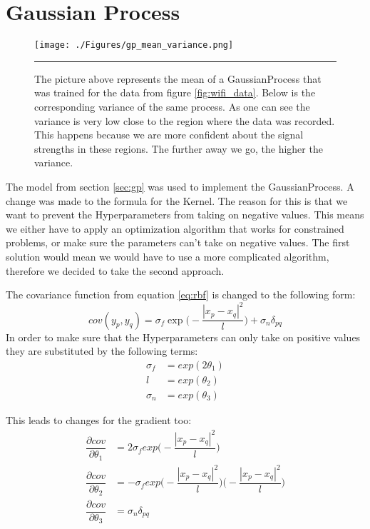 \section{Gaussian Process}\label{sec:gausspr}

\begin{figure}[htbp]
	\centering
		\texttt{[image: ./Figures/gp\_mean\_variance.png]}%
		\rule{35em}{0.5pt}
	\caption[Wi-Fi data and the corresponding \Gls{GaussianProcess}]{The picture above represents the mean of a \Gls{GaussianProcess} that was trained for the data from figure \ref{fig:wifi_data}. Below is the corresponding variance of the same process. As one can see the variance is very low close to the region where the data was recorded. This happens because we are more confident about the signal strengths in these regions. The further away we go, the higher the variance.}
	\label{fig:gp_mean_var}
\end{figure}
The model from section \ref{sec:gp} was used to implement the \Gls{GaussianProcess}. A change was made to the formula for the \gls{Kernel}. The reason for this is that we want to prevent the \gls{Hyperparameter}s from taking on negative values. This means we either have to apply an optimization algorithm that works for constrained problems, or make sure the parameters can't take on negative values. The first solution would mean we would have to use a more complicated algorithm, therefore we decided to take the second approach. 

The covariance function from equation \ref{eq:rbf} is changed to the following form:
\begin{equation}
cov(y_p,y_q) = \sigma_f \exp\bigg(-\dfrac{|x_p-x_q|^2}{l}\bigg) + \sigma_n \delta_{pq}
\end{equation}
In order to make sure that the \gls{Hyperparameter}s can only take on positive values they are substituted by the following terms:
\begin{equation}
\begin{aligned}
\sigma_f &= exp(2\theta_1)\\
l &= exp(\theta_2)\\
\sigma_n &= exp(\theta_3)
\end{aligned}
\end{equation}

This leads to changes for the gradient too:
\begin{equation}
\begin{aligned}
\dfrac{\partial cov}{\partial \theta_1} &= 2\sigma_f exp\bigg(-\dfrac{|x_p-x_q|^2}{l}\bigg)\\
\dfrac{\partial cov}{\partial \theta_2} &= -\sigma_f exp\bigg(-\dfrac{|x_p-x_q|^2}{l}\bigg)\bigg(-\dfrac{|x_p-x_q|^2}{l}\bigg)\\
\dfrac{\partial cov}{\partial \theta_3} &= \sigma_n\delta_{pq}
\end{aligned}
\end{equation}

